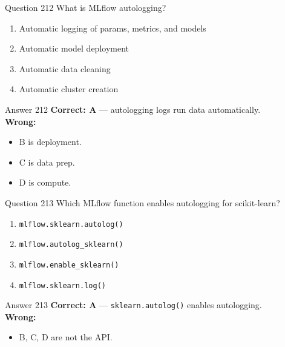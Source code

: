 \documentclass[aspectratio=169,11pt]{beamer}
\begin{document}
	\begin{frame}{Question 212}
		What is MLflow autologging?
		\begin{enumerate}[label=\Alph*.]
			\item Automatic logging of params, metrics, and models
			\item Automatic model deployment
			\item Automatic data cleaning
			\item Automatic cluster creation
		\end{enumerate}
	\end{frame}
	\begin{frame}{Answer 212}
		\textbf{Correct: A} --- autologging logs run data automatically.\\
		\vspace{0.5em}
		\textbf{Wrong:}
		\begin{itemize}
			\item B is deployment.
			\item C is data prep.
			\item D is compute.
		\end{itemize}
	\end{frame}
	
	\begin{frame}{Question 213}
		Which MLflow function enables autologging for scikit-learn?
		\begin{enumerate}[label=\Alph*.]
			\item \texttt{mlflow.sklearn.autolog()}
			\item \texttt{mlflow.autolog\_sklearn()}
			\item \texttt{mlflow.enable\_sklearn()}
			\item \texttt{mlflow.sklearn.log()}
		\end{enumerate}
	\end{frame}
	\begin{frame}{Answer 213}
		\textbf{Correct: A} --- \texttt{sklearn.autolog()} enables autologging.\\
		\vspace{0.5em}
		\textbf{Wrong:}
		\begin{itemize}
			\item B, C, D are not the API.
		\end{itemize}
	\end{frame}
	
\end{document}

